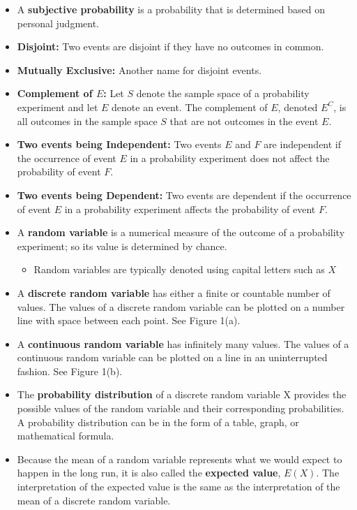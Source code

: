 \documentclass{report}
\begin{document}
\begin{itemize}
        \item A \textbf{subjective probability} is a probability that is determined based on personal judgment.
        \item \textbf{Disjoint:} Two events are disjoint if they have no outcomes in common. 
        \item \textbf{Mutually Exclusive:} Another name for disjoint events.
        \item \textbf{Complement of $E$:} Let $S$ denote the sample space of a probability experiment and let $E$ denote an event. The complement of $E $, denoted $E^{C} $, is all outcomes in the sample space $S $ that are not outcomes in the event $E $.
        \item \textbf{Two events being Independent: } Two events $E$ and $F$ are independent if the occurrence of event $E$ in a probability experiment does not affect the probability of event $F $.
        \item \textbf{Two events being Dependent:} Two events are dependent if the occurrence of event $E $ in a probability experiment affects the probability of event $F$.
        \item A \textbf{random variable} is a numerical measure of the outcome of a probability experiment; so its value is determined by chance.
        \begin{itemize}
          \item Random variables are typically denoted using capital letters such as $X$ 
        \end{itemize}
        \item A \textbf{discrete random variable} has either a finite or countable number of values. The values of a discrete random variable can be plotted on a number line with space between each point. See Figure 1(a).
        \item A \textbf{continuous random variable} has infinitely many values. The values of a continuous random variable can be plotted on a line in an uninterrupted fashion. See Figure 1(b).
        \item The \textbf{probability distribution} of a discrete random variable X provides the possible values of the random variable and their corresponding probabilities. A probability distribution can be in the form of a table, graph, or mathematical formula.
        \item Because the mean of a random variable represents what we would expect to happen in the long run, it is also called the \textbf{expected value}, $E(X)$. The interpretation of the expected value is the same as the interpretation of the mean of a discrete random variable.

\end{itemize}
\end{document}
